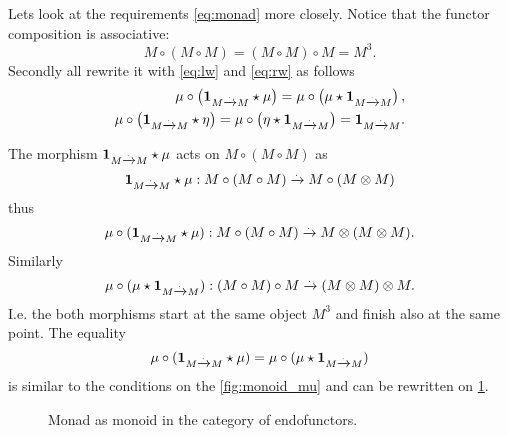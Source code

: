 Lets look at the requirements \eqref{eq:monad} more closely. Notice
that the functor composition is associative:
\[
M \circ ( M \circ M ) = (M \circ M) \circ M = M^3.
\]
Secondly 
all rewrite it with \eqref{eq:lw} and \eqref{eq:rw} as follows
\begin{eqnarray}
  \mu \circ \left( \mathbf{1}_{ M \xrightarrow{.} M } \star \mu \right) = 
  \mu \circ \left( \mu \star \mathbf{1}_{ M \xrightarrow{.} M } \right), 
  \nonumber \\
  \mu \circ \left( \mathbf{1}_{ M \xrightarrow{.} M } \star \eta \right) = 
  \mu \circ \left( \eta \star \mathbf{1}_{ M \xrightarrow{.} M } \right) = \mathbf{1}_{ M \xrightarrow{.} M }.
  \label{eq:monad_p1}
\end{eqnarray}

The morphism $\mathbf{1}_{ M \xrightarrow{.} M } \star \mu$ acts on $M \circ ( M \circ M )$ as
\[
\mathbf{1}_{ M \xrightarrow{.} M } \star \mu : M \circ ( M \circ M ) \xrightarrow{.} M \circ (M \otimes M)
\]
thus
\[
\mu \circ (\mathbf{1}_{ M \xrightarrow{.} M } \star \mu) : M \circ ( M \circ M ) \xrightarrow{.} M \otimes (M \otimes M).
\]
Similarly 
\[
\mu \circ (\mu \star \mathbf{1}_{ M \xrightarrow{.} M }) : (M \circ  M) \circ M  \xrightarrow{.} ( M \otimes M) \otimes M.
\]
I.e. the both morphisms start at the same object $M^3$ and finish also
at the same point. The equality 
\[
\mu \circ (\mathbf{1}_{ M \xrightarrow{.} M } \star \mu) = 
\mu \circ (\mu \star \mathbf{1}_{ M \xrightarrow{.} M })
\]
is similar to the conditions on the \cref{fig:monoid_mu} and can be
rewritten on \cref{fig:monad_monoid1}. 

\begin{figure}
  \centering
  \caption{Monad as monoid in the category of endofunctors.}
  \label{fig:monad_monoid1}
\end{figure}


